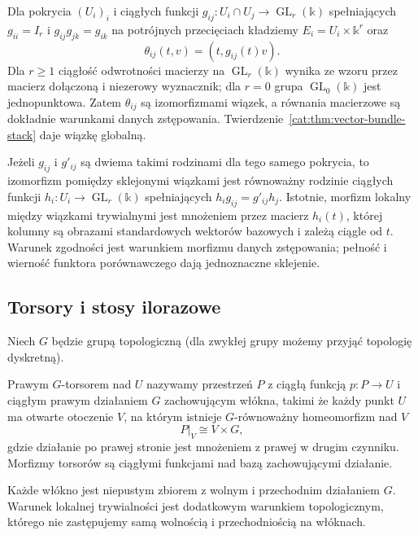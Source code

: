 \begin{przyklad}\label{cat:ex:bundle-transition-cocycle}
Dla pokrycia $(U_i)_i$ i ciągłych funkcji $g_{ij}:U_i\cap U_j\to\operatorname{GL}_r(\mathbb k)$ spełniających $g_{ii}=I_r$ i $g_{ij}g_{jk}=g_{ik}$ na potrójnych przecięciach kładziemy $E_i=U_i\times\mathbb k^r$ oraz
\[
 \theta_{ij}(t,v)=(t,g_{ij}(t)v).
\]
Dla $r\geq1$ ciągłość odwrotności macierzy na $\operatorname{GL}_r(\mathbb k)$ wynika ze wzoru przez macierz dołączoną i niezerowy wyznacznik; dla $r=0$ grupa $\operatorname{GL}_0(\mathbb k)$ jest jednopunktowa. Zatem $\theta_{ij}$ są izomorfizmami wiązek, a równania macierzowe są dokładnie warunkami danych zstępowania. Twierdzenie~\ref{cat:thm:vector-bundle-stack} daje wiązkę globalną.

Jeżeli $g_{ij}$ i $g'_{ij}$ są dwiema takimi rodzinami dla tego samego pokrycia, to izomorfizm pomiędzy sklejonymi wiązkami jest równoważny rodzinie ciągłych funkcji $h_i:U_i\to\operatorname{GL}_r(\mathbb k)$ spełniających $h_i g_{ij}=g'_{ij}h_j$. Istotnie, morfizm lokalny między wiązkami trywialnymi jest mnożeniem przez macierz $h_i(t)$, której kolumny są obrazami standardowych wektorów bazowych i zależą ciągle od $t$. Warunek zgodności jest warunkiem morfizmu danych zstępowania; pełność i wierność funktora porównawczego dają jednoznaczne sklejenie.
\end{przyklad}

\subsection{Torsory i stosy ilorazowe}

Niech $G$ będzie grupą topologiczną (dla zwykłej grupy możemy przyjąć topologię dyskretną).

\begin{definicja}\label{cat:def:topological-torsor}
Prawym $G$-torsorem nad $U$ nazywamy przestrzeń $P$ z ciągłą funkcją $p:P\to U$ i ciągłym prawym działaniem $G$ zachowującym włókna, takimi że każdy punkt $U$ ma otwarte otoczenie $V$, na którym istnieje $G$-równoważny homeomorfizm nad $V$
\[
 P|_V\cong V\times G,
\]
gdzie działanie po prawej stronie jest mnożeniem z prawej w drugim czynniku. Morfizmy torsorów są ciągłymi funkcjami nad bazą zachowującymi działanie.
\end{definicja}
Każde włókno jest niepustym zbiorem z wolnym i przechodnim działaniem $G$. Warunek lokalnej trywialności jest dodatkowym warunkiem topologicznym, którego nie zastępujemy samą wolnością i przechodniością na włóknach.

